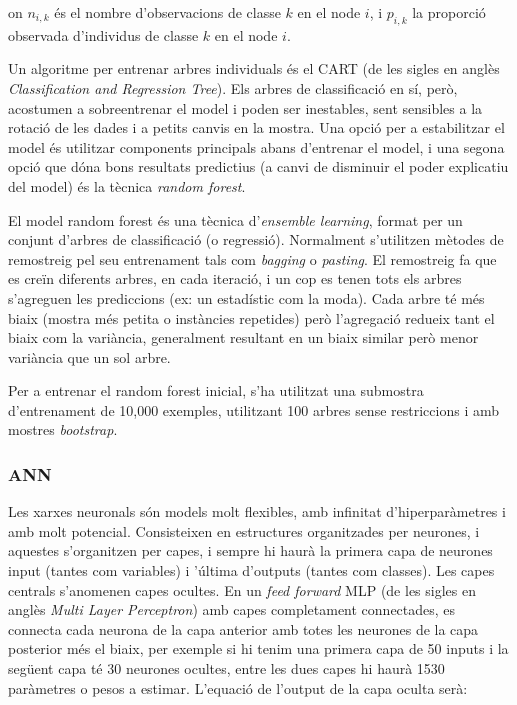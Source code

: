 \documentclass[12pt, spanish]{article}
\begin{document}
on $n_{i,k}$ és el nombre d'observacions de classe $k$ en el node $i$, i $p_{i,k}$ la proporció observada d'individus de classe $k$ en el node $i$. 

Un algoritme per entrenar arbres individuals és el CART (de les sigles en anglès \textit{Classification and Regression Tree}). Els arbres de classificació en sí, però, acostumen a sobreentrenar el model i poden ser inestables, sent sensibles a la rotació de les dades i a petits canvis en la mostra. Una opció per a estabilitzar el model és utilitzar components principals abans d'entrenar el model, i una segona opció que dóna bons resultats predictius (a canvi de disminuir el poder explicatiu del model) és la tècnica \textit{random forest}.

El model random forest és una tècnica d'\textit{ensemble learning}, format per un conjunt d'arbres de classificació (o regressió). Normalment s'utilitzen mètodes de remostreig pel seu entrenament tals com \textit{bagging} o \textit{pasting}. El remostreig fa que es creïn diferents arbres, en cada iteració, i un cop es tenen tots els arbres s'agreguen les prediccions (ex: un estadístic com la moda). Cada arbre té més biaix (mostra més petita o instàncies repetides) però  l'agregació redueix tant el biaix com la variància, generalment resultant en un biaix similar però menor variància que un sol arbre.

Per a entrenar el random forest inicial, s'ha utilitzat una submostra d'entrenament de 10,000 exemples, utilitzant 100 arbres sense restriccions i amb mostres \textit{bootstrap}. 

\subsubsection{ANN}

Les xarxes neuronals són models molt flexibles, amb infinitat d'hiperparàmetres i amb molt potencial. Consisteixen en estructures organitzades per neurones, i aquestes s'organitzen per capes, i sempre hi haurà la primera capa de neurones input (tantes com variables) i 'última d'outputs (tantes com classes). Les capes centrals s'anomenen capes ocultes. En un \textit{feed forward} MLP (de les sigles en anglès \textit{Multi Layer Perceptron}) amb capes completament connectades, es connecta cada neurona de la capa anterior amb totes les neurones de la capa posterior més el biaix, per exemple si hi tenim una primera capa de 50 inputs i la següent capa té 30 neurones ocultes, entre les dues capes hi haurà 1530 paràmetres o pesos  a estimar. L'equació de l'output de la capa oculta serà:
\end{document}
